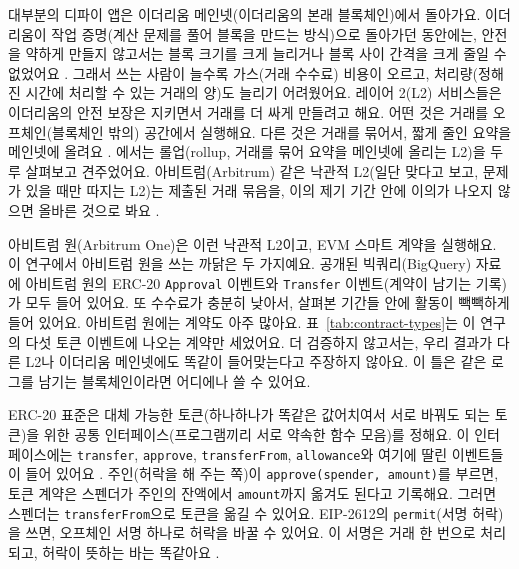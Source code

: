 
대부분의 디파이 앱은 이더리움 메인넷(이더리움의 본래 블록체인)에서 돌아가요. 이더리움이 작업 증명(계산 문제를 풀어 블록을 만드는 방식)으로 돌아가던 동안에는, 안전을 약하게 만들지 않고서는 블록 크기를 크게 늘리거나 블록 사이 간격을 크게 줄일 수 없었어요 \parencite{gervais2016pow}. 그래서 쓰는 사람이 늘수록 가스(거래 수수료) 비용이 오르고, 처리량(정해진 시간에 처리할 수 있는 거래의 양)도 늘리기 어려웠어요. 레이어 2(L2) 서비스들은 이더리움의 안전 보장은 지키면서 거래를 더 싸게 만들려고 해요. 어떤 것은 거래를 오프체인(블록체인 밖의) 공간에서 실행해요. 다른 것은 거래를 묶어서, 짧게 줄인 요약을 메인넷에 올려요 \parencite{gudgeon2020layertwo}. \textcite{thibault2022rollups}에서는 롤업(rollup, 거래를 묶어 요약을 메인넷에 올리는 L2)을 두루 살펴보고 견주었어요. 아비트럼(Arbitrum) 같은 낙관적 L2(일단 맞다고 보고, 문제가 있을 때만 따지는 L2)는 제출된 거래 묶음을, 이의 제기 기간 안에 이의가 나오지 않으면 올바른 것으로 봐요 \parencite{kalodner2018arbitrum}.

아비트럼 원(Arbitrum One)은 이런 낙관적 L2이고, EVM 스마트 계약을 실행해요. 이 연구에서 아비트럼 원을 쓰는 까닭은 두 가지예요. 공개된 빅쿼리(BigQuery) 자료에 아비트럼 원의 ERC-20 \texttt{Approval} 이벤트와 \texttt{Transfer} 이벤트(계약이 남기는 기록)가 모두 들어 있어요. 또 수수료가 충분히 낮아서, 살펴본 기간들 안에 활동이 빽빽하게 들어 있어요. 아비트럼 원에는 계약도 아주 많아요. 표~\ref{tab:contract-types}는 이 연구의 다섯 토큰 이벤트에 나오는 계약만 세었어요. 더 검증하지 않고서는, 우리 결과가 다른 L2나 이더리움 메인넷에도 똑같이 들어맞는다고 주장하지 않아요. 이 틀은 같은 로그를 남기는 블록체인이라면 어디에나 쓸 수 있어요.


ERC-20 표준은 대체 가능한 토큰(하나하나가 똑같은 값어치여서 서로 바꿔도 되는 토큰)을 위한 공통 인터페이스(프로그램끼리 서로 약속한 함수 모음)를 정해요. 이 인터페이스에는 \texttt{transfer}, \texttt{approve}, \texttt{transferFrom}, \texttt{allowance}와 여기에 딸린 이벤트들이 들어 있어요 \parencite{vogelsteller2015erc20}. 주인(허락을 해 주는 쪽)이 \texttt{approve(spender, amount)}를 부르면, 토큰 계약은 스펜더가 주인의 잔액에서 \texttt{amount}까지 옮겨도 된다고 기록해요. 그러면 스펜더는 \texttt{transferFrom}으로 토큰을 옮길 수 있어요. EIP-2612의 \texttt{permit}(서명 허락)을 쓰면, 오프체인 서명 하나로 허락을 바꿀 수 있어요. 이 서명은 거래 한 번으로 처리되고, 허락이 뜻하는 바는 똑같아요 \parencite{lundfall2020permit}.

